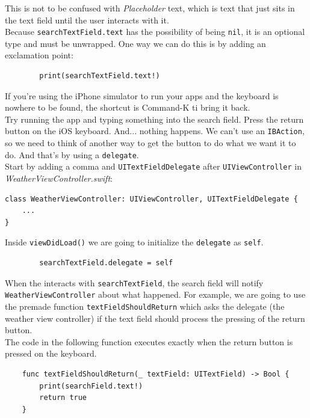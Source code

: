 \documentclass[12pt, letterpaper]{article}
\begin{document}
This is not to be confused with \emph{Placeholder} text, which is text that just sits in the text field until the user
interacts with it. \\

Because \verb+searchTextField.text+ has the possibility of being \verb+nil+, it is an optional type and must be unwrapped.
One way we can do this is by adding an exclamation point:

\begin{verbatim}
        print(searchTextField.text!)
\end{verbatim}

If you're using the iPhone simulator to run your apps and the keyboard is nowhere to be found, the shortcut is Command-K ti
bring it back. \\

Try running the app and typing something into the search field. Press the return button on the iOS keyboard. And... nothing
happens. We can't use an \verb+IBAction+, so we need to think of another way to get the button to do what we want it to do.
And that's by using a \verb+delegate+. \\

Start by adding a comma and \verb+UITextFieldDelegate+ after \verb+UIViewController+ in \emph{WeatherViewController.swift}:

\begin{verbatim}
class WeatherViewController: UIViewController, UITextFieldDelegate {
    ...
}
\end{verbatim}

Inside \verb+viewDidLoad()+ we are going to initialize the \verb+delegate+ as \verb+self+. 

\begin{verbatim}
        searchTextField.delegate = self
\end{verbatim}

When the interacts with \verb+searchTextField+, the search field will notify \verb+WeatherViewController+ about what happened.
For example, we are going to use the premade function \newline \verb+textFieldShouldReturn+ which asks the delegate
(the weather view controller) if the text field should process the pressing of the return button. \\

The code in the following function executes exactly when the return button is pressed on the keyboard.

\begin{verbatim}
    func textFieldShouldReturn(_ textField: UITextField) -> Bool {
        print(searchField.text!)
        return true
    }
\end{verbatim}
\end{document}

